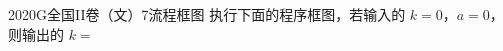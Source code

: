
\begin{problem}{2020}{G}{全国II卷（文）}{7}{流程框图}
执行下面的程序框图，若输入的 $ k=0 $，$ a=0 $，则输出的 $ k= $
\end{problem}

\begin{answer}

\end{answer}

\begin{solutions}

\end{solutions}